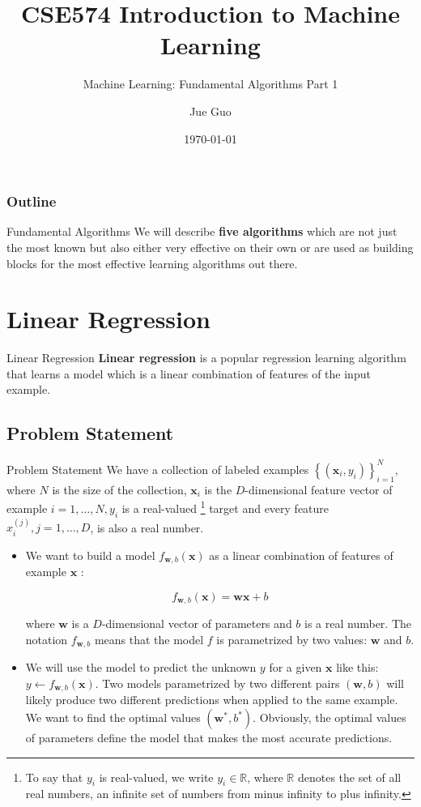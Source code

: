 \documentclass[9pt,dvipsnames]{beamer}
\title{CSE574 Introduction to Machine Learning}
\subtitle{Machine Learning: Fundamental Algorithms Part 1}
\author{Jue Guo}
\institute{University at Buffalo}
\date{\today}
\begin{document}
\begin{frame}
    \titlepage
\end{frame}

\begin{frame}
    \frametitle{Outline}
    \tableofcontents
\end{frame}

\begin{frame}{Fundamental Algorithms}
    We will describe \textbf{five algorithms} which are not just the most known but also either very effective on their own or are used as building blocks for the most effective learning algorithms out there.
\end{frame}

\section{Linear Regression}
\begin{frame}{Linear Regression}
	\textbf{Linear regression} is a popular regression learning algorithm that learns a model which is a linear combination of features of the input example.
\end{frame}

\subsection{Problem Statement}
\begin{frame}{Problem Statement}
	We have a collection of labeled examples $\left\{\left(\mathbf{x}_{i}, y_{i}\right)\right\}_{i=1}^{N}$, where $N$ is the size of the collection, $\mathbf{x}_{i}$ is the $D$-dimensional feature vector of example $i=1, \ldots, N, y_{i}$ is a real-valued 
		\footnote{To say that $y_{i}$ is real-valued, we write $y_{i} \in \mathbb{R}$, where $\mathbb{R}$ denotes the set of all real numbers, an infinite set of  numbers from minus infinity to plus infinity.
		} target and every feature $x_{i}^{(j)}, j=1, \ldots, D$, is also a real number.
	
	\begin{itemize}
		\item 	We want to build a model $f_{\mathbf{w}, b}(\mathbf{x})$ as a linear combination of features of example $\mathbf{x}$ :
		
		$$
		f_{\mathbf{w}, b}(\mathbf{x})=\mathbf{w} \mathbf{x}+b
		$$
		
		where $\mathbf{w}$ is a $D$-dimensional vector of parameters and $b$ is a real number. The notation $f_{\mathbf{w}, b}$ means that the model $f$ is parametrized by two values: $\mathbf{w}$ and $b$.
		\item We will use the model to predict the unknown $y$ for a given $\mathbf{x}$ like this: $y \leftarrow f_{\mathbf{w}, b}(\mathbf{x})$. Two models parametrized by two different pairs $(\mathbf{w}, b)$ will likely produce two different predictions 
		when applied to the same example. We want to find the optimal values $\left(\mathbf{w}^{*}, b^{*}\right)$. Obviously,  the optimal values of parameters define the model that makes the most accurate predictions.
	\end{itemize}
\end{frame}
\end{document}
